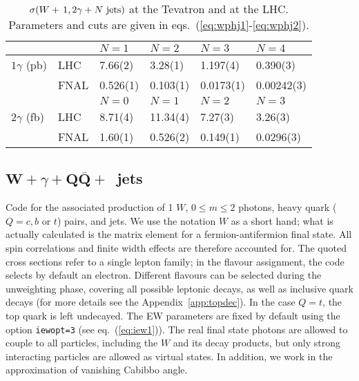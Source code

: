 \documentclass[paper]{JHEP3}
\newcommand{\ccaption}[2]{
    \begin{center}
    \parbox{0.85\textwidth}{
      \caption[#1]{\small{{#2}}}
      }
    \end{center}
    }
\def    \Qbar   {\overline{Q}}
\begin{document}
{\renewcommand{\arraystretch}{1.2}
\begin{table}
\begin{center}
\begin{tabular}{||l|l|l|l|l|l||}\hline
  & & $N = 1$  & 
$N = 2$ & $N = 3$ & $N = 4$ \\ 
\hline
$1\gamma$ (pb)  & LHC       & 7.66(2)  & 3.28(1)  & 1.197(4) & 0.390(3) \\ 
                & FNAL  & 0.526(1) & 0.103(1) & 0.0173(1)& 0.00242(3) \\
\hline
  & & $N = 0$  & 
$N = 1$ & $N = 2$ & $N = 3$ \\ 
\hline
$2\gamma$ (fb)  &  LHC      & 8.71(4)  & 11.34(4)  & 7.27(3) & 3.26(3) \\ 
                &  FNAL     & 1.60(1)  & 0.526(2)  & 0.149(1)& 0.0296(3)\\
\hline
\hline
\end{tabular}            
\ccaption{}{\label{tab:wphjxs} $\sigma( W +\,1,2\gamma + N~{\rm jets})$
at the Tevatron and 
at the LHC. Parameters and cuts are given
in eqs.~(\ref{eq:wphj1}-\ref{eq:wphj2}).}
\end{center}
\end{table} }

\subsection{$\mathbf{W+}$$\gamma+$$\mathbf{Q\Qbar+}$~jets}
\label{sec:wphqq}
Code for the associated production of 1 $W$, $0 \le m \le 2$ photons, 
heavy quark ($Q=c,b$ or $t$) pairs, and jets.  
We use the notation $W$ as a short hand; what is
actually calculated is the matrix element for a fermion-antifermion final
state. All spin correlations and finite width effects are therefore
accounted for.  
The quoted cross sections refer to a single lepton
family; in the flavour assignment, the code selects by default an
electron. Different flavours can be selected during the unweighting
phase, covering all possible leptonic decays, as well as inclusive
quark decays (for more details see the Appendix~\ref{app:topdec}).
In the case $Q=t$, the top quark is left undecayed.
The EW parameters are fixed by default using the option {\tt iewopt=3}
(see eq.~(\ref{eq:iew1})).
The real final state photons are allowed to couple to all particles, including
the $W$ and its decay products,
but only strong interacting particles are allowed as virtual states.
In addition, we work in the approximation of vanishing
Cabibbo angle.
\end{document}
